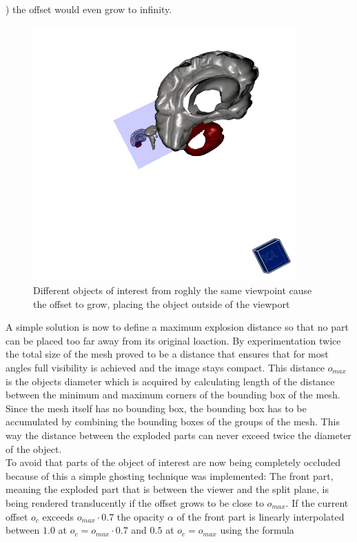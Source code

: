 ) the offset would even grow to infinity.\\
\begin{figure}[tb]
	\centering
	\includegraphics[width=0.9\textwidth]{chapters/figures/offset}
	\caption{Different objects of interest from roghly the same viewpoint cause the offset to grow, placing the object outside of the viewport}
	\label{fig:infinity}
\end{figure}
A simple solution is now to define a maximum explosion distance so that no part can be placed too far away from its original loaction. By experimentation twice the total size of the mesh proved to be a distance that ensures that for most angles full visibility is achieved and the image stays compact. This distance $o_{max}$ is the objects diameter which is acquired by calculating length of the distance between the minimum and maximum corners of the bounding box of the mesh. Since the mesh itself has no bounding box, the bounding box has to be accumulated by combining the bounding boxes of the groups of the mesh. This way the distance between the exploded parts can never exceed twice the diameter of the object.\\
To avoid that parts of the object of interest are now being completely occluded because of this a simple ghosting technique was implemented: 
The front part, meaning the exploded part that is between the viewer and the split plane, is being rendered translucently if the offset grows to be close to $o_{max}$. 
If the current offset $o_c$ exceeds $o_{max} \cdot 0.7$ the opacity $\alpha$ of the front part is linearly interpolated between $1.0$ at $o_c = o_{max} \cdot 0.7$ and $0.5$ at  $o_c = o_{max}$ using the formula
